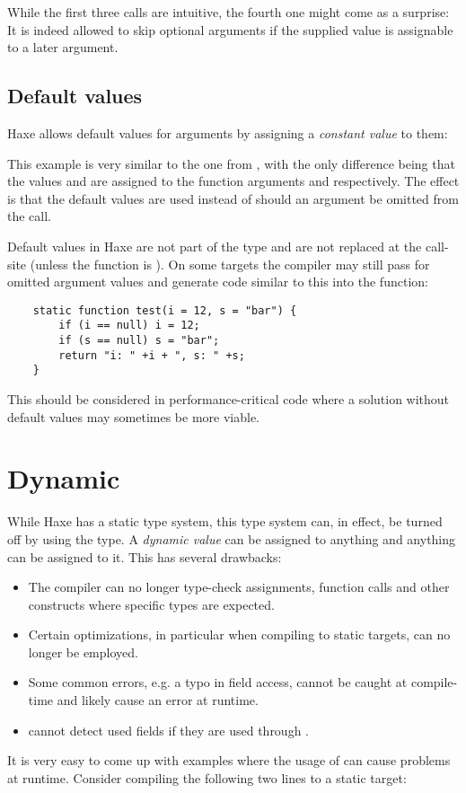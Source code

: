 While the first three calls are intuitive, the fourth one might come as a surprise: It is indeed allowed to skip optional arguments if the supplied value is assignable to a later argument.


\subsection{Default values}
\label{types-function-default-values}

Haxe allows default values for arguments by assigning a \emph{constant value} to them:

This example is very similar to the one from , with the only difference being that the values  and  are assigned to the function arguments  and  respectively. The effect is that the default values are used instead of  should an argument be omitted from the call.


Default values in Haxe are not part of the type and are not replaced at the call-site (unless the function is ). On some targets the compiler may still pass  for omitted argument values and generate code similar to this into the function:
\begin{lstlisting}
	static function test(i = 12, s = "bar") {
		if (i == null) i = 12;
		if (s == null) s = "bar";
		return "i: " +i + ", s: " +s;
	}
\end{lstlisting}
This should be considered in performance-critical code where a solution without default values may sometimes be more viable.




\section{Dynamic}
\label{types-dynamic}

While Haxe has a static type system, this type system can, in effect, be turned off by using the  type. A \emph{dynamic value} can be assigned to anything and anything can be assigned to it. This has several drawbacks:

\begin{itemize}
	\item The compiler can no longer type-check assignments, function calls and other constructs where specific types are expected.
	\item Certain optimizations, in particular when compiling to static targets, can no longer be employed.
	\item Some common errors, e.g. a typo in field access, cannot be caught at compile-time and likely cause an error at runtime.
	\item {} cannot detect used fields if they are used through .
\end{itemize}
It is very easy to come up with examples where the usage of  can cause problems at runtime. Consider compiling the following two lines to a static target:

